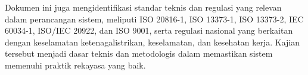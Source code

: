 \documentclass{elsinta}
\begin{document}
Dokumen ini juga mengidentifikasi standar teknis dan regulasi yang relevan dalam perancangan sistem, meliputi ISO 20816-1, ISO 13373-1, ISO 13373-2, IEC 60034-1, ISO/IEC 20922, dan ISO 9001, serta regulasi nasional yang berkaitan dengan keselamatan ketenagalistrikan, keselamatan, dan kesehatan kerja. Kajian tersebut menjadi dasar teknis dan metodologis dalam memastikan sistem memenuhi praktik rekayasa yang baik.

\newpage

\section{\ProjectBenchmarkTitle}

\subsection{\PrevProjectsTitle}

\end{document}
